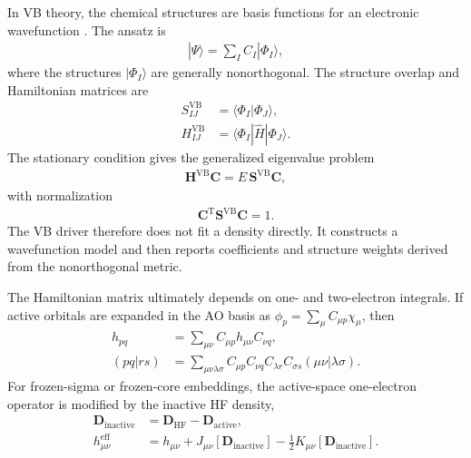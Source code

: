 \documentclass[11pt]{article}
\newcommand{\vb}{\mathrm{VB}}
\newcommand{\dens}{\mathbf{D}}
\begin{document}
In VB theory, the chemical structures are basis functions for an electronic wavefunction \cite{ShaikHibertyVB}.  The ansatz is
\begin{equation}
\begin{aligned}
	|\Psi\rangle = \sum_I C_I |\Phi_I\rangle,
\end{aligned}
\end{equation}
where the structures $|\Phi_I\rangle$ are generally nonorthogonal.  The structure overlap and Hamiltonian matrices are
\begin{equation}
\begin{aligned}
	S_{IJ}^{\vb} &= \langle \Phi_I | \Phi_J \rangle, \\
	H_{IJ}^{\vb} &= \langle \Phi_I | \hat{H} | \Phi_J \rangle.
\end{aligned}
\end{equation}
The stationary condition gives the generalized eigenvalue problem
\begin{align}
	\mathbf{H}^{\vb}\mathbf{C}
	= E\,\mathbf{S}^{\vb}\mathbf{C},
	\label{eq:vb-generalized-section2}
\end{align}
with normalization
\begin{equation}
\begin{aligned}
	\mathbf{C}^{\mathrm{T}}\mathbf{S}^{\vb}\mathbf{C}=1.
\end{aligned}
\end{equation}
The VB driver therefore does not fit a density directly.  It constructs a wavefunction model and then reports coefficients and structure weights derived from the nonorthogonal metric.

The Hamiltonian matrix ultimately depends on one- and two-electron integrals.  If active orbitals are expanded in the AO basis as $\phi_p=\sum_\mu C_{\mu p}\chi_\mu$, then
\begin{equation}
\begin{aligned}
	h_{pq} &= \sum_{\mu\nu} C_{\mu p} h_{\mu\nu} C_{\nu q}, \\
	(pq|rs) &= \sum_{\mu\nu\lambda\sigma}
	C_{\mu p}C_{\nu q}C_{\lambda r}C_{\sigma s}
	(\mu\nu|\lambda\sigma).
\end{aligned}
\end{equation}
For frozen-sigma or frozen-core embeddings, the active-space one-electron operator is modified by the inactive HF density,
\begin{equation}
\begin{aligned}
	\dens_{\mathrm{inactive}}
	&= \dens_{\mathrm{HF}} - \dens_{\mathrm{active}}, \\
	h^{\mathrm{eff}}_{\mu\nu}
	&= h_{\mu\nu}
	+ J_{\mu\nu}[\dens_{\mathrm{inactive}}]
	- \frac{1}{2}K_{\mu\nu}[\dens_{\mathrm{inactive}}].
\end{aligned}
\end{equation}
\end{document}
